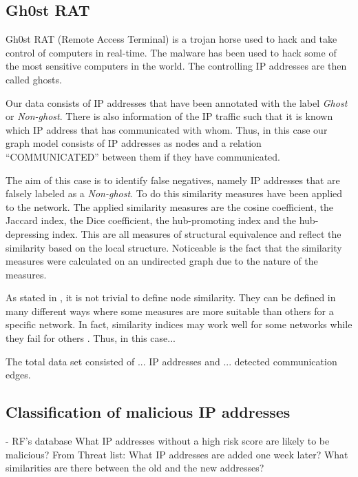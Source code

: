 \subsection{Gh0st RAT}
Gh0st RAT (Remote Access Terminal) is a trojan horse used to hack and take control of computers in real-time. The malware has been used to hack some of the most sensitive computers in the world. The controlling IP addresses are then called ghosts.


Our data consists of IP addresses that have been annotated with the label \textit{Ghost} or \textit{Non-ghost}. There is also information of the IP traffic such that it is known which IP address that has communicated with whom. Thus, in this case our graph model consists of IP addresses as nodes and a relation ``COMMUNICATED'' between them if they have communicated.

The aim of this case is to identify false negatives, namely IP addresses that are falsely labeled as a \textit{Non-ghost}. To do this similarity measures have been applied to the network. The applied similarity measures are the cosine coefficient, the Jaccard index, the Dice coefficient, the hub-promoting index and the hub-depressing index. This are all measures of structural equivalence and reflect the similarity based on the local structure. Noticeable is the fact that the similarity measures were calculated on an undirected graph due to the nature of the measures. 

As stated in , it is not trivial to define node similarity. They can be defined in many different ways where some measures are more suitable than others for a specific network. In fact, similarity indices may work well for some networks while they fail for others \citet{lu2011}. Thus, in this case...

The total data set consisted of ... IP addresses and ... detected communication edges. 


\subsection{Classification of malicious IP addresses }
- RF’s database
What IP addresses without a high risk score are likely to be malicious?
From Threat list: What IP addresses are added one week later? What similarities are there between the old and the new addresses? 

